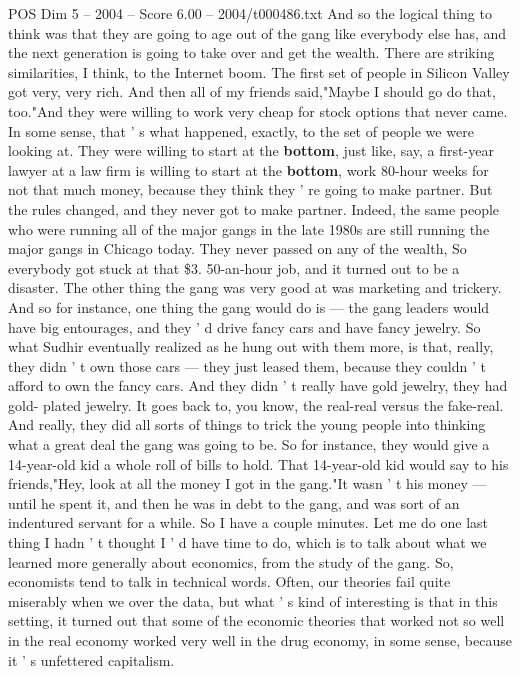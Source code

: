 \begin{textsample}{POS Dim 5 – 2004 – Score 6.00 – 2004/t000486.txt}
And so the logical thing to think was that they are going to age out of the gang like everybody else has, and the next generation is going to take over and get the wealth.
There are striking similarities, I think, to the Internet boom.
The first set of people in Silicon Valley got very, very rich.
And then all of my friends said,"Maybe I should go do that, too."And they were willing to work very cheap for stock options that never came.
In some sense, that ' s what happened, exactly, to the set of people we were looking at.
They were willing to start at the \textbf{bottom}, just like, say, a first-year lawyer at a law firm is willing to start at the \textbf{bottom}, work 80-hour weeks for not that much money, because they think they ' re going to make partner.
But the rules changed, and they never got to make partner.
Indeed, the same people who were running all of the major gangs in the late 1980s are still running the major gangs in Chicago today.
They never passed on any of the wealth, So everybody got stuck at that \$3. 50-an-hour job, and it turned out to be a disaster.
The other thing the gang was very good at was marketing and trickery.
And so for instance, one thing the gang would do is — the gang leaders would have big entourages, and they ' d drive fancy cars and have fancy jewelry.
So what Sudhir eventually realized as he hung out with them more, is that, really, they didn ' t own those cars — they just leased them, because they couldn ' t afford to own the fancy cars.
And they didn ' t really have gold jewelry, they had gold- plated jewelry.
It goes back to, you know, the real-real versus the fake-real.
And really, they did all sorts of things to trick the young people into thinking what a great deal the gang was going to be.
So for instance, they would give a 14-year-old kid a whole roll of bills to hold.
That 14-year-old kid would say to his friends,"Hey, look at all the money I got in the gang."It wasn ' t his money — until he spent it, and then he was in debt to the gang, and was sort of an indentured servant for a while.
So I have a couple minutes.
Let me do one last thing I hadn ' t thought I ' d have time to do, which is to talk about what we learned more generally about economics, from the study of the gang.
So, economists tend to talk in technical words.
Often, our theories fail quite miserably when we over the data, but what ' s kind of interesting is that in this setting, it turned out that some of the economic theories that worked not so well in the real economy worked very well in the drug economy, in some sense, because it ' s unfettered capitalism.

\end{textsample}
